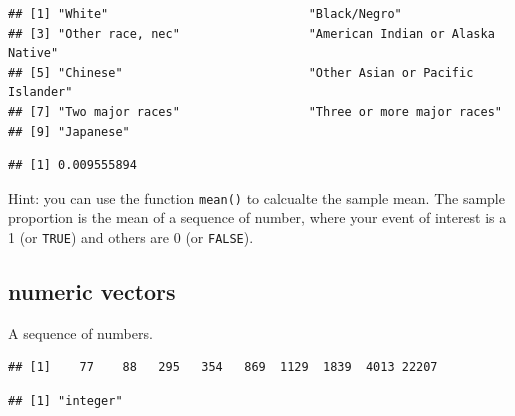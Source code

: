 \documentclass[
]{book}
\newenvironment{Shaded}{\begin{snugshade}}{\end{snugshade}}
\newcommand{\KeywordTok}[1]{\textcolor[rgb]{0.13,0.29,0.53}{\textbf{#1}}}
\newcommand{\NormalTok}[1]{#1}
\newcommand{\OperatorTok}[1]{\textcolor[rgb]{0.81,0.36,0.00}{\textbf{#1}}}
\newcommand{\StringTok}[1]{\textcolor[rgb]{0.31,0.60,0.02}{#1}}
\theoremstyle{definition}
\theoremstyle{definition}
\theoremstyle{definition}
\theoremstyle{remark}
\begin{document}
\begin{verbatim}
## [1] "White"                            "Black/Negro"                     
## [3] "Other race, nec"                  "American Indian or Alaska Native"
## [5] "Chinese"                          "Other Asian or Pacific Islander" 
## [7] "Two major races"                  "Three or more major races"       
## [9] "Japanese"
\end{verbatim}

\begin{Shaded}
\end{Shaded}

\begin{verbatim}
## [1] 0.009555894
\end{verbatim}

Hint: you can use the function \texttt{mean()} to calcualte the sample mean. The sample proportion is the mean of a sequence of number, where your event of interest is a 1 (or \texttt{TRUE}) and others are 0 (or \texttt{FALSE}).

\hypertarget{numeric-vectors}{%
\subsection{numeric vectors}\label{numeric-vectors}}

A sequence of numbers.

\begin{Shaded}
\end{Shaded}

\begin{verbatim}
## [1]    77    88   295   354   869  1129  1839  4013 22207
\end{verbatim}

\begin{Shaded}
\end{Shaded}

\begin{verbatim}
## [1] "integer"
\end{verbatim}
\end{document}
